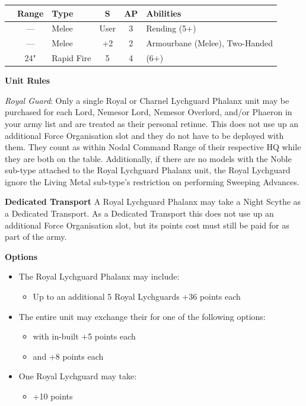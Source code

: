 \begin{minipage}[t]{0.72\textwidth}
	\begin{tabular}{L{90 pt} c C{40pt} *{2}{c} >{\raggedright\arraybackslash}p{130pt}}
		& Range & Type & S & AP & Abilities \\
		\hline
		 & — & Melee & User & 3 & Rending (5+) \\
		 & — & Melee & +2 & 2 & Armourbane (Melee), Two-Handed \\
		 & 24" & Rapid Fire & 5 & 4 &  (6+) \\
	\end{tabular}
	
	\vspace*{2em}
	\textbf{Unit Rules}
	
	\textit{Royal Guard}: Only a single Royal or Charnel Lychguard Phalanx unit may be purchased for each Lord, Nemesor Lord, Nemesor Overlord, and/or Phaeron in your army list and are treated as their personal retinue. This does not use up an additional Force Organisation slot and they do not have to be deployed with them. They count as within Nodal Command Range of their respective HQ while they are both on the table. Additionally, if there are no models with the Noble sub-type attached to the Royal Lychguard Phalanx unit, the Royal Lychguard ignore the Living Metal sub-type's restriction on performing Sweeping Advances.
	
	\vspace*{2em}
	\textbf{Dedicated Transport}
	A Royal Lychguard Phalanx may take a Night Scythe as a Dedicated Transport. As a Dedicated Transport this does not use up an additional Force Organisation slot, but its points cost must still be paid for as part of the army.
	
	\vspace*{2em}
	\textbf{Options}
	\begin{itemize}
		\item The Royal Lychguard Phalanx may include:
		\begin{itemize}
			\item Up to an additional 5 Royal Lychguards \dotfill +36 points each
		\end{itemize}
		\item The entire unit may exchange their  for one of the following options:
		\begin{itemize}
			\item {} with in-built  \dotfill +5 points each
			\item {} and  \dotfill +8 points each
		\end{itemize}
		\item One Royal Lychguard may take:
		\begin{itemize}
			\item {} \dotfill +10 points
		\end{itemize} 
	\end{itemize}
\end{minipage}
